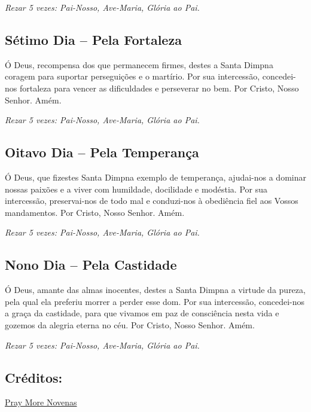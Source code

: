\documentclass[18pt]{article}
\begin{document}
\textit{Rezar 5 vezes: Pai-Nosso, Ave-Maria, Glória ao Pai.}

\subsection*{Sétimo Dia -- Pela Fortaleza}
Ó Deus, recompensa dos que permanecem firmes, destes a Santa Dimpna coragem para suportar perseguições e o martírio. Por sua intercessão, concedei-nos fortaleza para vencer as dificuldades e perseverar no bem. Por Cristo, Nosso Senhor. Amém.

\textit{Rezar 5 vezes: Pai-Nosso, Ave-Maria, Glória ao Pai.}

\subsection*{Oitavo Dia -- Pela Temperança}
Ó Deus, que fizestes Santa Dimpna exemplo de temperança, ajudai-nos a dominar nossas paixões e a viver com humildade, docilidade e modéstia. Por sua intercessão, preservai-nos de todo mal e conduzi-nos à obediência fiel aos Vossos mandamentos. Por Cristo, Nosso Senhor. Amém.

\textit{Rezar 5 vezes: Pai-Nosso, Ave-Maria, Glória ao Pai.}

\subsection*{Nono Dia -- Pela Castidade}
Ó Deus, amante das almas inocentes, destes a Santa Dimpna a virtude da pureza, pela qual ela preferiu morrer a perder esse dom. Por sua intercessão, concedei-nos a graça da castidade, para que vivamos em paz de consciência nesta vida e gozemos da alegria eterna no céu. Por Cristo, Nosso Senhor. Amém.

\textit{Rezar 5 vezes: Pai-Nosso, Ave-Maria, Glória ao Pai.}

\vfill

\subsection*{Créditos:}
\href{https://www.praymorenovenas.com/st-dymphna-novena}{Pray More Novenas}
\end{document}
